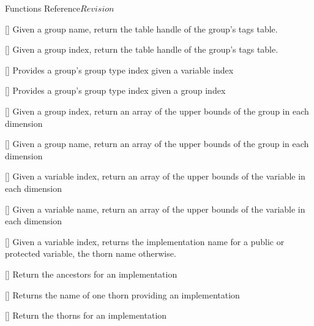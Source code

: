 \begin{cactuspart}{ Functions Reference}{}{$Revision$}
\begin{Lentry}
\item[\code{CCTK\_GroupTagsTable}] [\pageref{CCTK-GroupTagsTable}]
  Given a group name, return the table handle of the group's tags table.

\item[\code{CCTK\_GroupTagsTableI}] [\pageref{CCTK-GroupTagsTableI}]
  Given a group index, return the table handle of the group's tags table.

\item[\code{CCTK\_GroupTypeFromVarI}] [\pageref{CCTK-GroupTypeFromVarI}]
  Provides a group's group type index given a variable index

\item[\code{CCTK\_GroupTypeI}] [\pageref{CCTK-GroupTypeI}]
  Provides a group's group type index given a group index

\item[\code{CCTK\_GroupubndGI}] [\pageref{CCTK-GroupubndGI}]
  Given a group index, return an array of the upper bounds
  of the group in each dimension

\item[\code{CCTK\_GroupubndGN}] [\pageref{CCTK-GroupubndGN}]
  Given a group name, return an array of the upper bounds
  of the group in each dimension

\item[\code{CCTK\_GroupubndVI}] [\pageref{CCTK-GroupubndVI}]
  Given a variable index, return an array of the upper bounds
  of the variable in each dimension

\item[\code{CCTK\_GroupubndVN}] [\pageref{CCTK-GroupubndVN}]
  Given a variable name, return an array of the upper bounds
  of the variable in each dimension

\item[\code{CCTK\_ImpFromVarI}] [\pageref{CCTK-ImpFromVarI}]
  Given a variable index, returns the implementation name for
  a public or protected variable, the thorn name otherwise.

\item[\code{CCTK\_ImplementationRequires}]
  [\pageref{CCTK-ImplementationRequires}]
  Return the ancestors for an implementation

\item[\code{CCTK\_ImplementationThorn}]
  [\pageref{CCTK-ImplementationThorn}]
  Returns the name of one thorn providing an implementation

\item[\code{CCTK\_ImpThornList}] [\pageref{CCTK-ImpThornList}]
  Return the thorns for an implementation


\end{Lentry}
\end{cactuspart}
